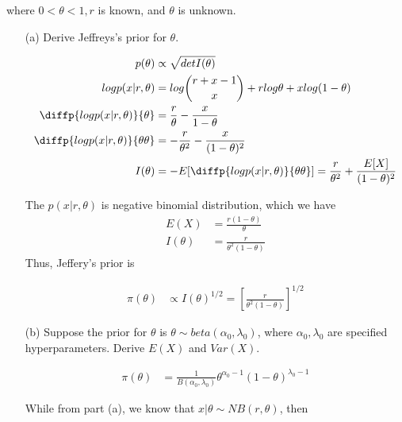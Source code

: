 where $0< \theta < 1, r$ is known, and $\theta$ is unknown.

\begin{itemize}
	\item [(a)] Derive Jeffreys's prior for $\theta$. 
	
\begin{align*}
	p(\theta) & \propto \sqrt{det I(\theta)} \\
	log p(x|r, \theta) &= log {r+x-1 \choose x} + rlog \theta + x log(1-\theta) \\
	\diffp{log p(x|r, \theta)}{\theta} &= \frac{r}{\theta} - \frac{x}{1-\theta} \\
	\diffp{log p(x|r, \theta)}{\theta \theta} &= -\frac{r}{\theta^2} - \frac{x}{(1-\theta)^2} \\
	I(\theta) &= -E[\diffp{log p(x|r, \theta)}{\theta \theta} ] = \frac{r}{\theta^2} + \frac{E[X]}{(1-\theta)^2}
\end{align*}	
	
	The $p(x|r, \theta)$ is negative binomial distribution, which we have 
\begin{align*}
	E(X) &= \frac{r(1-\theta)}{\theta} \\
	I(\theta) &= \frac{r}{\theta^2 (1-\theta)}
\end{align*}	
Thus, Jeffery's prior is 

\begin{align*}
	\pi(\theta) & \propto  I(\theta)^{1/2} = [\frac{r}{\theta^2 (1-\theta)}]^{1/2}
\end{align*}	
	
	\item[(b)] Suppose the prior for $\theta$ is $\theta \sim beta(\alpha_0, \lambda_0)$, where $\alpha_0, \lambda_0$ are specified hyperparameters. Derive $E(X)$ and $Var(X)$.
	
	\begin{align*}
		\pi(\theta)	&= \frac{1}{B(\alpha_0, \lambda_0)} \theta^{\alpha_0 -1} (1-\theta)^{\lambda_0 -1} 
	\end{align*}	
	
	While from part (a), we know that $x|\theta \sim NB(r, \theta)$, then 
	

\end{itemize}
